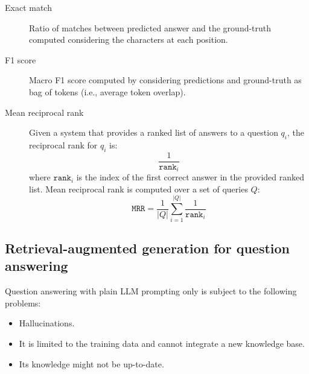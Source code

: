 \begin{description}
    \item[Exact match] 
        Ratio of matches between predicted answer and the ground-truth computed considering the characters at each position.

    \item[F1 score] 
        Macro F1 score computed by considering predictions and ground-truth as bag of tokens (i.e., average token overlap).

    \item[Mean reciprocal rank] 
        Given a system that provides a ranked list of answers to a question $q_i$, the reciprocal rank for $q_i$ is:
        \[ \frac{1}{\texttt{rank}_i} \]
        where $\texttt{rank}_i$ is the index of the first correct answer in the provided ranked list.
        Mean reciprocal rank is computed over a set of queries $Q$:
        \[ \texttt{MRR} = \frac{1}{|Q|} \sum_{i=1}^{|Q|} \frac{1}{\texttt{rank}_i} \]

\end{description}


\subsection{Retrieval-augmented generation for question answering}

\begin{remark}
    Question answering with plain LLM prompting only is subject to the following problems:
    \begin{itemize}
        \item Hallucinations.
        \item It is limited to the training data and cannot integrate a new knowledge base.
        \item Its knowledge might not be up-to-date.
    \end{itemize}
\end{remark}

